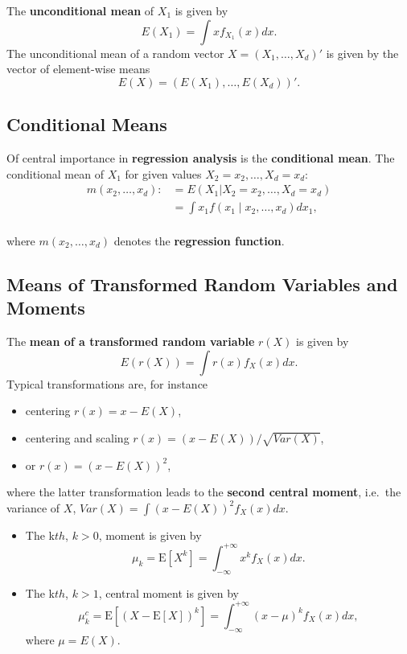 \documentclass[
  14pt,
]{memoir}
\begin{document}
The \textbf{unconditional mean} of \(X_1\) is given by
\[
E(X_1)= \int x f_{X_1}(x)dx.
\]
The unconditional mean of a random vector \(X=(X_1,\dots,X_d)'\) is given by the vector of element-wise means
\[
E(X)=(E(X_1),\dots,E(X_d))'.
\]

\hypertarget{conditional-means}{%
\subsection{Conditional Means}\label{conditional-means}}

Of central importance in \textbf{regression analysis} is the \textbf{conditional mean}. The conditional mean of \(X_1\) for given values \(X_2=x_2,\ldots,X_d=x_d\):
\begin{align*}
  m(x_2,\dots,x_d):&=E(X_1|X_2=x_2,\ldots,X_d=x_d)\\
                   &= \int x_1 f(x_1\mid x_2,\ldots,x_d)dx_1,
\end{align*}\\
where \(m(x_2,\dots,x_d)\) denotes the \textbf{regression function}.

\hypertarget{means-of-transformed-random-variables-and-moments}{%
\subsection{Means of Transformed Random Variables and Moments}\label{means-of-transformed-random-variables-and-moments}}

The \textbf{mean of a transformed random variable} \(r(X)\) is given by
\[
E(r(X))=\int r(x) f_{X}(x)dx.
\]
Typical transformations are, for instance

\begin{itemize}
\item centering $r(x)=x-E(X)$,
\item centering and scaling $r(x)=(x-E(X))/\sqrt{Var(X)}$, 
\item or $r(x)=(x - E(X))^2$, 
\end{itemize}

where the latter transformation leads to the \textbf{second central moment}, i.e.~the variance of \(X\), \(Var(X)=\int (x - E(X))^2 f_{X}(x)dx\).

\bigskip

\begin{itemize}
\item
  The k\(th\), \(k>0\), moment is given by
  \[
  \mu_{k}=\mathrm{E}\left[X^{k}\right]=\int_{-\infty}^{+\infty}x^{k} f_X(x)d x.
  \]
\item
  The k\(th\), \(k>1\), central moment is given by
  \[
  \mu^c_{k}=\mathrm{E}\left[(X-\mathrm{E}[X])^{k}\right]=\int_{-\infty}^{+\infty}(x-\mu)^{k} f_X(x)d x,
  \]
  where \(\mu=E(X)\).
\end{itemize}
\end{document}
